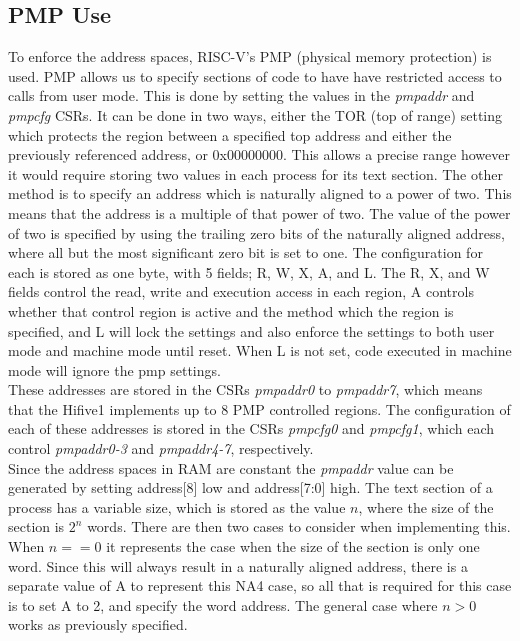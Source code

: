 \subsection{PMP Use}
To enforce the address spaces, RISC-V's PMP (physical memory protection) is used. PMP allows us to specify sections of code to have have restricted access to calls from user mode. This is done by setting the values in the \textit{pmpaddr} and \textit{pmpcfg} CSRs. It can be done in two ways, either the TOR (top of range) setting which protects the region between a specified top address and either the previously referenced address, or 0x00000000. This allows a precise range however it would require storing two values in each process for its text section. The other method is to specify an address which is naturally aligned to a power of two. This means that the address is a multiple of that power of two. The value of the power of two is specified by using the trailing zero bits of the naturally aligned address, where all but the most significant zero bit is set to one. The configuration for each is stored as one byte, with 5 fields; R, W, X, A, and L. The R, X, and W fields control the read, write and execution access in each region, A controls whether that control region is active and the method which the region is specified, and L will lock the settings and also enforce the settings to both user mode and machine mode until reset. When L is not set, code executed in machine mode will ignore the \ac{pmp} settings.\\
These addresses are stored in the CSRs \textit{pmpaddr0} to \textit{pmpaddr7}, which means that the Hifive1 implements up to 8 PMP controlled regions. The configuration of each of these addresses is stored in the CSRs \textit{pmpcfg0} and \textit{pmpcfg1}, which each control \textit{pmpaddr0-3} and \textit{pmpaddr4-7}, respectively.\\

Since the address spaces in RAM are constant the \textit{pmpaddr} value can be generated by setting address[8] low and address[7:0] high. The text section of a process has a variable size, which is stored as the value \(n\), where the size of the section is \(2^n\) words. There are then two cases to consider when implementing this. When \(n == 0\) it represents the case when the size of the section is only one word. Since this will always result in a naturally aligned address, there is a separate value of A to represent this NA4 case, so all that is required for this case is to set A to 2, and specify the word address. The general case where \(n > 0\) works as previously specified. 
